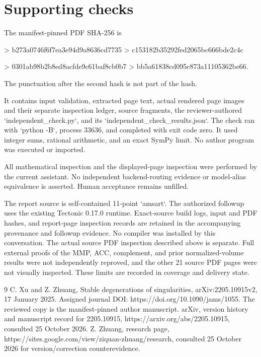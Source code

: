 \documentclass[10pt]{article}
\begin{document}
\section*{Supporting checks}
The manifest-pinned PDF SHA-256 is\par
> b273a0746f6f7ea3e94d9a8636cd7735
> c153182b35292fed2065bc666bde2c4c\par
> 0301ab98b2b8ed8acfde9c61baf8cb0b7
> bb5a61838cd095c873a11105362be66.\par
The punctuation after the second hash is not part of the hash.\par
It contains input validation, extracted page text, actual rendered page images and their separate inspection ledger, source fragments, the reviewer-authored `independent\_check.py`, and its `independent\_check\_results.json`. The check ran with `python -B`, process 33636, and completed with exit code zero. It used integer sums, rational arithmetic, and an exact SymPy limit. No author program was executed or imported.\par
All mathematical inspection and the displayed-page inspection were performed by the current assistant. No independent backend-routing evidence or model-alias equivalence is asserted. Human acceptance remains unfilled.\par
The report source is self-contained 11-point `amsart`. The authorized followup uses the existing Tectonic 0.17.0 runtime. Exact-source build logs, input and PDF hashes, and report-page inspection records are retained in the accompanying provenance and followup evidence. No compiler was installed by this conversation. The actual source PDF inspection described above is separate. Full external proofs of the MMP, ACC, complement, and prior normalized-volume results were not independently reproved, and the other 21 source PDF pages were not visually inspected. These limits are recorded in coverage and delivery state.\par
9 C. Xu and Z. Zhuang, Stable degenerations of singularities, arXiv:2205.10915v2, 17 January 2025. Assigned journal DOI: https://doi.org/10.1090/jams/1055. The reviewed copy is the manifest-pinned author manuscript. arXiv, version history and manuscript record for 2205.10915, https://arxiv.org/abs/2205.10915, consulted 25 October 2026. Z. Zhuang, research page, https://sites.google.com/view/ziquan-zhuang/research, consulted 25 October 2026 for version/correction counterevidence.\par
\end{document}
